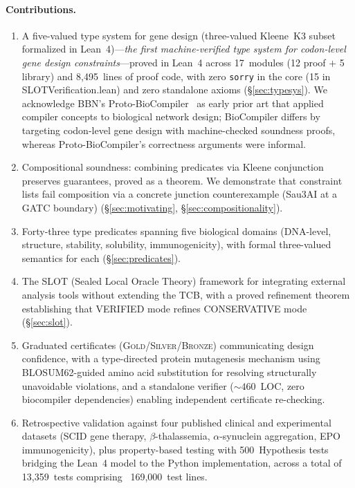 \documentclass[acmsmall,review,anonymous]{acmart}
\newcommand{\GOLD}{\textsc{Gold}\xspace}
\newcommand{\SILVER}{\textsc{Silver}\xspace}
\newcommand{\BRONZE}{\textsc{Bronze}\xspace}
\begin{document}
\paragraph{Contributions.}
\begin{enumerate}[leftmargin=*,itemsep=1pt,topsep=2pt]
\item A five-valued type system for gene design (three-valued Kleene~K3
      subset formalized in Lean~4)---\emph{the first machine-verified type
      system for codon-level gene design constraints}---proved in
      Lean~4 across 17~modules (12 proof $+$ 5 library) and
      8,495~lines of proof code, with zero \texttt{sorry} in the core (15 in SLOTVerification.lean) and zero standalone
      axioms (\S\ref{sec:typesys}).  We acknowledge BBN's
      Proto-BioCompiler~\cite{beal2011protobiocompiler} as early prior
      art that applied compiler concepts to biological network design;
      BioCompiler differs by targeting codon-level gene design with
      machine-checked soundness proofs, whereas Proto-BioCompiler's
      correctness arguments were informal.

\item Compositional soundness: combining predicates via Kleene
      conjunction preserves guarantees, proved as a theorem.
      We demonstrate that constraint lists fail composition via a
      concrete junction counterexample (Sau3AI at a GATC boundary)
      (\S\ref{sec:motivating}, \S\ref{sec:compositionality}).

\item Forty-three type predicates spanning five biological domains
      (DNA-level, structure, stability, solubility, immunogenicity),
      with formal three-valued semantics for each
      (\S\ref{sec:predicates}).

\item The SLOT (Sealed Local Oracle Theory) framework for
      integrating external analysis tools without extending the TCB,
      with a proved refinement theorem establishing that VERIFIED mode
      refines CONSERVATIVE mode (\S\ref{sec:slot}).

\item Graduated certificates (\GOLD/\SILVER/\BRONZE) communicating
      design confidence, with a type-directed protein mutagenesis
      mechanism using BLOSUM62-guided amino acid substitution for
      resolving structurally unavoidable violations, and a standalone
      verifier (${\sim}460$~LOC, zero biocompiler dependencies)
      enabling independent certificate re-checking.

\item Retrospective validation against four published clinical and
      experimental datasets (SCID gene therapy, $\beta$-thalassemia,
      $\alpha$-synuclein aggregation, EPO immunogenicity), plus
      property-based testing with 500~Hypothesis tests bridging the
      Lean~4 model to the Python implementation, across a total of
      13,359~tests comprising ~169,000~test lines.
\end{enumerate}
\end{document}
